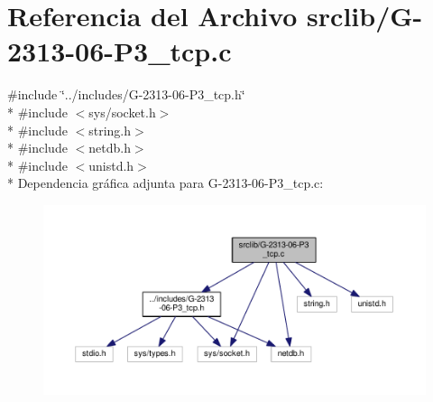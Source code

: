 \hypertarget{G-2313-06-P3__tcp_8c}{}\section{Referencia del Archivo srclib/\+G-\/2313-\/06-\/\+P3\+\_\+tcp.c}
\label{G-2313-06-P3__tcp_8c}
{\ttfamily \#include \char`\"{}../includes/\+G-\/2313-\/06-\/\+P3\+\_\+tcp.\+h\char`\"{}}\\*
{\ttfamily \#include $<$sys/socket.\+h$>$}\\*
{\ttfamily \#include $<$string.\+h$>$}\\*
{\ttfamily \#include $<$netdb.\+h$>$}\\*
{\ttfamily \#include $<$unistd.\+h$>$}\\*
Dependencia gráfica adjunta para G-\/2313-\/06-\/\+P3\+\_\+tcp.c\+:
\nopagebreak
\begin{figure}[H]
\begin{center}
\leavevmode
\includegraphics[width=350pt]{G-2313-06-P3__tcp_8c__incl}
\end{center}
\end{figure}
